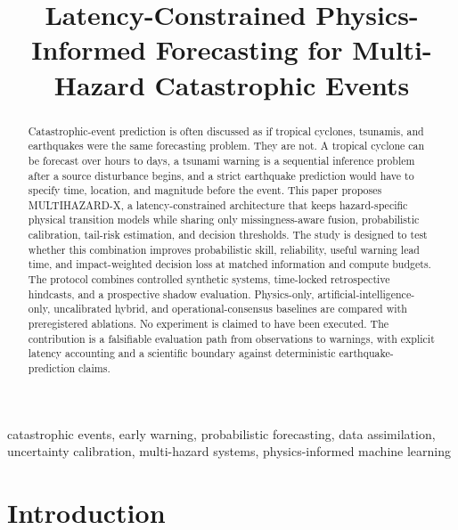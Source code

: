 \documentclass[conference]{IEEEtran}
\begin{document}
\title{Latency-Constrained Physics-Informed Forecasting for Multi-Hazard Catastrophic Events}

\author{
}

\maketitle

\begin{abstract}
Catastrophic-event prediction is often discussed as if tropical cyclones, tsunamis, and earthquakes were the same forecasting problem. They are not. A tropical cyclone can be forecast over hours to days, a tsunami warning is a sequential inference problem after a source disturbance begins, and a strict earthquake prediction would have to specify time, location, and magnitude before the event. This paper proposes MULTIHAZARD-X, a latency-constrained architecture that keeps hazard-specific physical transition models while sharing only missingness-aware fusion, probabilistic calibration, tail-risk estimation, and decision thresholds. The study is designed to test whether this combination improves probabilistic skill, reliability, useful warning lead time, and impact-weighted decision loss at matched information and compute budgets. The protocol combines controlled synthetic systems, time-locked retrospective hindcasts, and a prospective shadow evaluation. Physics-only, artificial-intelligence-only, uncalibrated hybrid, and operational-consensus baselines are compared with preregistered ablations. No experiment is claimed to have been executed. The contribution is a falsifiable evaluation path from observations to warnings, with explicit latency accounting and a scientific boundary against deterministic earthquake-prediction claims.
\end{abstract}

\begin{IEEEkeywords}
catastrophic events, early warning, probabilistic forecasting, data assimilation, uncertainty calibration, multi-hazard systems, physics-informed machine learning
\end{IEEEkeywords}

\section{Introduction}
\end{document}
